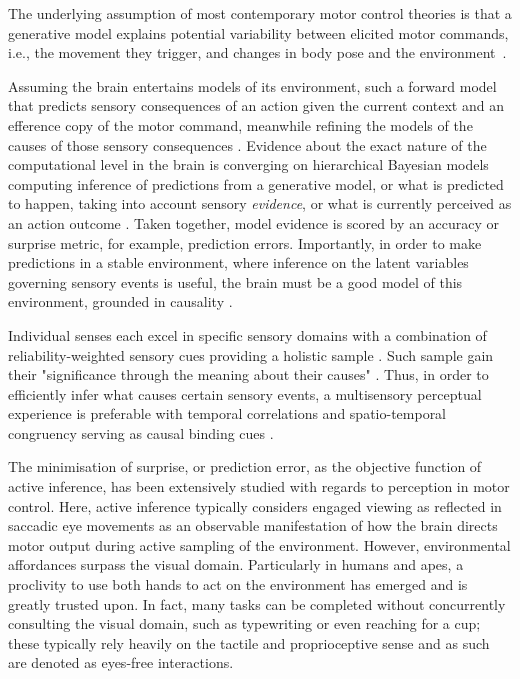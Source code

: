 The underlying assumption of most contemporary motor control theories is that a generative model explains potential variability between elicited motor commands, i.e., the movement they trigger, and changes in body pose and the environment~\cites{Wolpert2011, Shadmehr2010}.

Assuming the brain entertains models of its environment, such a forward model that predicts sensory consequences of an action given the current context and an efference copy of the motor command, meanwhile refining the models of the causes of those sensory consequences \cites{Pearson2011, Friston2010, Friston2016a}. Evidence about the exact nature of the computational level in the brain is converging on hierarchical Bayesian models computing inference of predictions from a generative model, or what is predicted to happen, taking into account sensory \textit{evidence}, or what is currently perceived as an action outcome \cite{Knill2004, Shams2010}. Taken together, model evidence is scored by an accuracy or surprise metric, for example, prediction errors. Importantly, in order to make predictions in a stable environment, where inference on the latent variables governing sensory events is useful, the brain must be a good model of this environment, grounded in causality \cite{Friston2016a}.

Individual senses each excel in specific sensory domains with a combination of reliability-weighted sensory cues providing a holistic sample \cite{Fetsch2012, Cao2019}. Such sample gain their "significance through the meaning about their causes" \cite{Kording2007}. Thus, in order to efficiently infer what causes certain sensory events, a multisensory perceptual experience is preferable with temporal correlations and spatio-temporal congruency serving as causal binding cues \cite{Robertson2003}. 


The minimisation of surprise, or prediction error, as the objective function of active inference, has been extensively studied with regards to perception in motor control. Here, active inference typically considers engaged viewing as reflected in saccadic eye movements as an observable manifestation of how the brain directs motor output during active sampling of the environment. However, environmental affordances surpass the visual domain. Particularly in humans and apes, a proclivity to use both hands to act on the environment has emerged and is greatly trusted upon. In fact, many tasks can be completed without concurrently consulting the visual domain, such as typewriting or even reaching for a cup; these typically rely heavily on the tactile and proprioceptive sense and as such are denoted as eyes-free interactions. 

